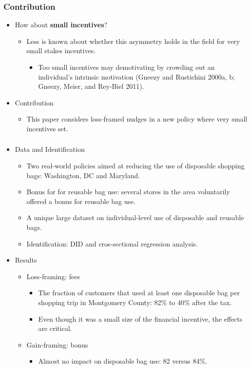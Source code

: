 \documentclass[dvipdfmx,11pt]{beamer}
\begin{document}
\begin{frame}\frametitle{Contribution}
  \begin{itemize}
    \item How about \textbf{small incentives}?
    \begin{itemize}
      \item Less is known about whether this asymmetry holds in the field for very small stakes incentives.
      \begin{itemize}
        \item Too small incentives may demotivating by crowding out an individual's intrinsic motivation (Gneezy and Rustichini 2000a, b; Gneezy, Meier, and Rey-Biel 2011).
      \end{itemize}
    \end{itemize}
    \item Contribution
    \begin{itemize}
      \item This paper considers loss-framed nudges in a new policy where very small incentives set.
    \end{itemize}
  \end{itemize}
\end{frame}

\begin{frame}\frametitle{}
  \begin{itemize}
    \item Data and Identification
    \begin{itemize}
      \item Two real-world policies aimed at reducing the use of disposable shopping bags: Washington, DC and Maryland.
      \item Bonus for for reusable bag use: several stores in the area voluntarily offered a bonus for reusable bag use.
      \item A unique large dataset on individual-level use of disposable and reusable bags.
      \item Identification: DID and cros-sectional regression analysis.
    \end{itemize}
    \item Results
    \begin{itemize}
      \item Loss-framing: fees
      \begin{itemize}
        \item The fraction of customers that used at least one disposable bag per shopping trip in Montgomery County: 82\% to 40\% after the tax.
        \item Even though it was a small size of the financial incentive, the effects are critical.
      \end{itemize}
      \item Gain-framing: bonus
      \begin{itemize}
        \item Almost no impact on disposable bag use: 82 versus 84\%.
      \end{itemize}
    \end{itemize}
  \end{itemize}
\end{frame}
\end{document}
